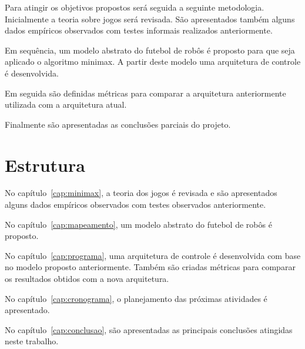 Para atingir os objetivos propostos será seguida a seguinte metodologia.
Inicialmente a teoria sobre jogos será revisada. São apresentados também
alguns dados empíricos observados com testes informais realizados anteriormente.

Em sequência, um modelo abstrato do futebol de robôs é proposto para que seja
aplicado o algoritmo minimax. A partir deste modelo uma arquitetura de controle
é desenvolvida.

Em seguida são definidas métricas para comparar a arquitetura anteriormente
utilizada com a arquitetura atual.

Finalmente são apresentadas as conclusões parciais do projeto.

\section{Estrutura}

No capítulo~\ref{cap:minimax}, a teoria dos jogos é revisada e são apresentados
alguns dados empíricos observados com testes observados anteriormente.

No capítulo~\ref{cap:mapeamento}, um modelo abstrato do futebol de robôs é
proposto.

No capítulo~\ref{cap:programa}, uma arquitetura de controle é desenvolvida com
base no modelo proposto anteriormente. Também são criadas métricas para
comparar os resultados obtidos com a nova arquitetura.

No capítulo~\ref{cap:cronograma}, o planejamento das próximas atividades é
apresentado.

No capítulo~\ref{cap:conclusao}, são apresentadas as principais conclusões
atingidas neste trabalho.

